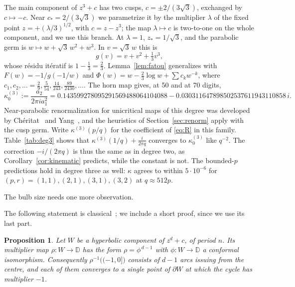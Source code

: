 \documentclass[11pt]{amsart}
\newtheorem{proposition}[theorem]{Proposition}
\theoremstyle{definition}
\theoremstyle{remark}
\newcommand{\D}{\mathbb{D}}
\begin{document}
The main component of $z^3+c$ has two cusps, $c=\pm2/(3\sqrt3)$, exchanged by $c\mapsto-c$. Near $c_*=2/(3\sqrt3)$ we parametrize it by the multiplier $\lambda$ of the fixed point $z=+(\lambda/3)^{1/2}$, with $c=z-z^3$; the map $\lambda\mapsto c$ is two-to-one on the whole component, and we use this branch. At $\lambda=1$, $z_*=1/\sqrt3$, and the parabolic germ is $w\mapsto w+\sqrt3\,w^2+w^3$. In $v=\sqrt3\,w$ this is
\[
g(v)=v+v^2+\tfrac13v^3,
\]
whose r\'esidu it\'eratif is $1-\frac13=\frac23$. Lemma~\ref{lem:fatou} generalizes with $F(w)=-1/g(-1/w)$ and $\Phi(w)=w-\frac23\log w+\sum c_kw^{-k}$, where $c_1,c_2,\ldots=\frac29,\frac5{54},\frac{14}{243},\frac{89}{2430},\ldots$. The horn map gives, at 50 and at 70 digits,
\[
\kappa_0^{(3)}:=\frac{a_2}{2\pi ia_1^2}=0.143599278095291569488064104088-0.030311647898502537611943110858\,i .
\]
Near-parabolic renormalization for unicritical maps of this degree was developed by Ch\'eritat~\cite{Cheritat} and Yang~\cite{Yang}, and the heuristics of Section~\ref{sec:renorm} apply with the cusp germ. Write $\kappa^{(3)}(p/q)$ for the coefficient of \eqref{eq:R} in this family. Table~\ref{tab:deg3} shows that $\kappa^{(3)}(1/q)+\frac i{2\pi q}$ converges to $\kappa_0^{(3)}$ like $q^{-2}$. The correction $-i/(2\pi q)$ is thus the same as in degree two, as Corollary~\ref{cor:kinematic} predicts, while the constant is not. The bounded-$p$ predictions hold in degree three as well: $\kappa$ agrees to within $5\cdot10^{-6}$ for $(p,r)=(1,1),(2,1),(3,1),(3,2)$ at $q\approx512p$.

\begin{table}[t]
\centering\small

\caption{Degree three: $\kappa^{(3)}(1/q)$ from Cauchy integrals on $|u|=1$ (Appendix~\ref{app:num}) against the horn map of the cubic cusp germ.}\label{tab:deg3}
\end{table}

The bulb size needs one more observation.

The following statement is classical~\cite{MilnorHC}; we include a short proof, since we use its last part.

\begin{proposition}\label{prop:antipodes}
Let $W$ be a hyperbolic component of $z^d+c$, of period $n$. Its multiplier map $\rho:W\to\D$ has the form $\rho=\phi^{\,d-1}$ with $\phi:W\to\D$ a conformal isomorphism. Consequently $\rho^{-1}\bigl((-1,0]\bigr)$ consists of $d-1$ arcs issuing from the centre, and each of them converges to a single point of $\partial W$ at which the cycle has multiplier $-1$.
\end{proposition}
\end{document}
